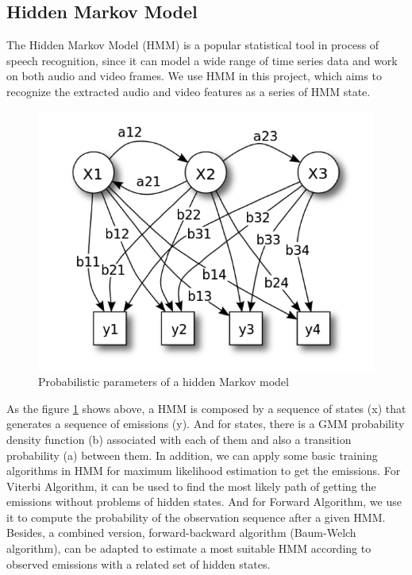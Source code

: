   
  
  
\subsection{Hidden Markov Model}
The Hidden Markov Model \cite{Reference15}(HMM) is a popular statistical tool in process of speech recognition, since it can model a wide range of time series data and work on both audio and video frames. We use HMM in this project, which aims to recognize the extracted audio and video features as a series of HMM state. 


\begin{figure}[ht]
\centering
\includegraphics[width=0.5\linewidth]{figures/hmm.png}
\caption{Probabilistic parameters of a hidden Markov model}
\label{fig:hmm}
\end{figure}



As the figure \ref{fig:hmm} shows above, a HMM is composed by a sequence of states (x) that generates a sequence of emissions (y). And for states, there is a GMM probability density function (b) associated with each of them and also a transition probability (a) between them.  In addition, we can apply some basic training algorithms in HMM for maximum likelihood estimation to get the emissions. For Viterbi Algorithm\cite{Reference16}, it can be used to find the most likely path of getting the emissions without problems of hidden states. And for Forward Algorithm, we use it to compute the probability of the observation sequence after a given HMM. Besides, a combined version, forward-backward algorithm (Baum-Welch algorithm), can be adapted to estimate a most suitable HMM according to observed emissions with a related set of hidden states.

